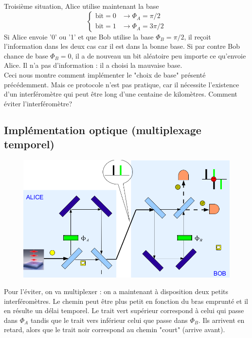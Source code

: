 Troisième situation, Alice utilise maintenant la base
\begin{equation}
\left\{\begin{array}{ll}
\text{bit} = 0 &\to \Phi_A=\pi/2\\
\text{bit} = 1 &\to \Phi_A=3\pi/2
\end{array}\right.
\end{equation}
Si Alice envoie '0' ou '1' et que Bob utilise la base $\Phi_B=\pi/2$, il reçoit l'information dans
les deux cas car il est dans la bonne base. Si par contre Bob chance de base $\Phi_B=0$, il a de nouveau un bit aléatoire peu importe ce qu'envoie Alice. Il n'a pas d'information : il a choisi la mauvaise
base.\\

Ceci nous montre comment implémenter le "choix de base" présenté précédemment. Mais ce protocole
n'est pas pratique, car il nécessite l'existence d'un interféromètre qui peut être long d'une centaine
de kilomètres. Comment éviter l'interféromètre?


\subsection{Implémentation optique (multiplexage temporel)}
	\begin{figure}
	\vspace{-5mm}
	\includegraphics[scale=0.2]{ch3/image12}
	\end{figure}
Pour l'éviter, on va multiplexer : on a maintenant à disposition deux petits interféromètres. Le
chemin peut être plus petit en fonction du bras emprunté et il en résulte un délai temporel. Le 
trait vert supérieur correspond à celui qui passe dans $\Phi_A$ tandis que le trait vers inférieur
celui que passe dans $\Phi_B$. Ils arrivent en retard, alors que le trait noir correspond au 
chemin "court" (arrive avant). 

